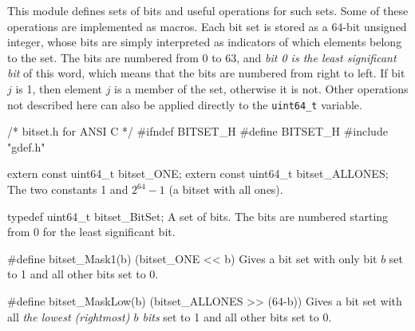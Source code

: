 
This module defines sets of bits and useful operations for such sets.
Some of these operations are implemented as macros.
Each bit set is stored as a 64-bit unsigned integer, whose bits are simply interpreted
as indicators of which elements belong to the set.
The bits are numbered from 0 to 63, and
\emph{bit 0 is the least significant bit} of this word,
which means that the bits are numbered from right to left.
%
If bit $j$ is 1, then element $j$ is a member of the set, otherwise it is not.
Other operations not described here can also be applied directly
to the \texttt{uint64\_t} variable.


\code\hide
/* bitset.h  for ANSI C */
#ifndef BITSET_H
#define BITSET_H
#include "gdef.h"
\endhide\endcode


\code

extern const uint64_t bitset_ONE;
extern const uint64_t bitset_ALLONES;   
\endcode
\tab
  The two constants 1 and $2^{64}-1$ (a bitset with all ones).
\endtab
\iffalse  %
\code

extern uint64_t bitset_MASK1[];
\endcode
 \tab {\tt bitset\_MASK1[j]} has only \emph{bit} $j$ set to 1 and all other
  bits set to 0.
  \pierre{Not sure if it is worthwhile to store and retrieve all these constants.
	  See \url{http://c-faq.com/misc/bitsets.html} and
    \url{https://github.com/iplinux/x11proto-trap/blob/master/xtrapbits.h}
		for alternatives.}
 \endtab
\code

extern uint64_t bitset_MASK[];
\endcode
 \tab {\tt bitset\_MASK[j]} has all \emph{the first $j$ bits} set to 1 and all other
  bits set to 0.
 \endtab
\fi  %

\code

typedef uint64_t bitset_BitSet;
\endcode
 \tab  A set of bits. The bits are numbered starting from 0 for the least significant bit.
 \endtab



\code

#define bitset_Mask1(b) (bitset_ONE << b)
\endcode
 \tab Gives a bit set with only bit $b$ set to 1 and all other bits set to 0.
 \endtab
\code

#define bitset_MaskLow(b) (bitset_ALLONES >> (64-b))
\endcode
 \tab Gives a bit set with all \emph{the lowest (rightmost) $b$ bits} set to 1
  and all other bits set to 0.
 \endtab
\code

